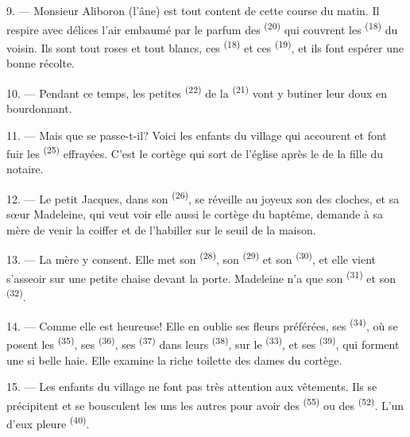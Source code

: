 \VUsaut{4.0mm}
\VUsaut{3.4mm}

9. --- Monsieur Aliboron (l'âne) est tout content de cette course du matin. Il
respire avec délices l'air embaumé par le parfum des 
\textsuperscript{(20)} qui couvrent les 
\textsuperscript{(18)} du  voisin. Ils sont tout roses et tout
blancs, ces  \textsuperscript{(18)} et ces
 \textsuperscript{(19)}, et ils font espérer une bonne
récolte.

10. --- Pendant ce temps, les petites  \textsuperscript{(22)}
de la  \textsuperscript{(21)} vont y butiner leur doux
 en bourdonnant.

11. --- Mais que se passe-t-il? Voici les enfants du village qui accourent et
font fuir les  \textsuperscript{(25)} effrayées. C'est le cortège
qui sort de l'église après le  de la fille du notaire.

12. --- Le petit Jacques, dans son  \textsuperscript{(26)}, se
réveille au joyeux son des cloches, et sa sœur Madeleine, qui veut voir elle
aussi le cortège du baptême, demande à sa mère de venir la coiffer et de
l'habiller sur le seuil de la maison.

13. --- La mère y consent. Elle met son 
\textsuperscript{(28)}, son  \textsuperscript{(29)} et son
 \textsuperscript{(30)}, et elle vient s'asseoir sur une petite
chaise devant la porte. Madeleine n'a que son 
\textsuperscript{(31)} et son  \textsuperscript{(32)}.

14. --- Comme elle est heureuse! Elle en oublie ses fleurs préférées, ses
 \textsuperscript{(34)}, où se posent les 
\textsuperscript{(35)}, ses  \textsuperscript{(36)}, ses
 \textsuperscript{(37)} dans leurs 
\textsuperscript{(38)}, sur le  \textsuperscript{(33)}, et ses
 \textsuperscript{(39)}, qui forment une si belle haie. Elle
examine la riche toilette des dames du cortège.

15. --- Les enfants du village ne font pas très attention aux vêtements. Ils se
précipitent et se bousculent les uns les autres pour avoir des 
\textsuperscript{(55)} ou des  \textsuperscript{(52)}.
L'un d'eux pleure \textsuperscript{(40)}.

